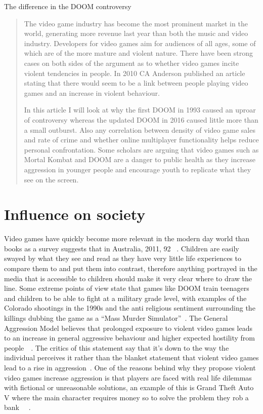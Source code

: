 \documentclass[12pt]{article}
\begin{document}
\maketitle
The difference in the DOOM controversy

\begin{abstract}
The video game industry has become the most prominent market in the world, generating more revenue last year than both the music and video industry. Developers for video games aim for audiences of all ages, some of which are of the more mature and violent nature.
There have been strong cases on both sides of the argument as to whether video games incite violent tendencies in people. In 2010 CA Anderson published an article stating that there would seem to be a link between people playing video games and an increase in violent behaviour.

In this article I will look at why the first DOOM in 1993 caused an uproar of controversy whereas the updated DOOM in 2016 caused little more than a small outburst. Also any correlation between density of video game sales and rate of crime and whether online multiplayer functionality helps reduce personal confrontation. Some scholars are arguing that video games such as Mortal Kombat and DOOM are a danger to public health as they increase aggression in younger people and encourage youth to replicate what they see on the screen.
\end{abstract}


\section{Influence on society}
Video games have quickly become more relevant in the modern day world than books as a survey suggests that in Australia, 2011, 92%
~\cite{Martin:2011:PGE:2071536.2071566}. Children are easily swayed by what they see and read as they have very little life experiences to compare them to and put them into contrast, therefore anything portrayed in the media that is accessible to children should make it very clear where to draw the line.
Some extreme points of view state that games like DOOM train teenagers and children to be able to fight at a military grade level, with examples of the Colorado shootings in the 1990s and the anti religious sentiment surrounding the killings dubbing the game as a “Mass Murder Simulator”~\cite{videogamescankill}.
The General Aggression Model believes that prolonged exposure to violent video games leads to an increase in general aggressive behaviour and higher expected hostility from people~\cite{Ashbarry:2016:BVE:2967934.2968111}~\cite{Fumhe:2015:VGP:2815782.2815790}. The critics of this statement say that it's down to the way the individual perceives it rather than the blanket statement that violent video games lead to a rise in aggression~\cite{5369086}. One of the reasons behind why they propose violent video games increase aggression is that players are faced with real life dilemmas with fictional or unreasonable solutions, an example of this is Grand Theft Auto V where the main character requires money so to solve the problem they rob a bank~\cite {Zendle:2015:HGF:2793107.2793113} ~\cite {Gotterbarn}.
\end{document}
